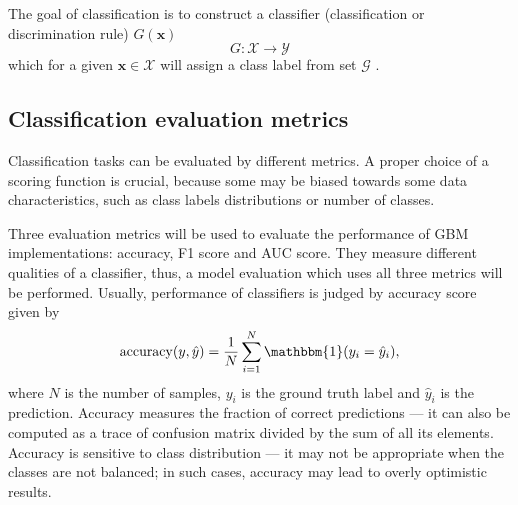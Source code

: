 \documentclass[magisterska, english]{pwr_wmat_praca_dyplomowa}
\theoremstyle{plain}
\numberwithin{theorem}{chapter}
\theoremstyle{definition}
\numberwithin{theorem}{chapter}
\begin{document}
The goal of classification is to construct a classifier (classification or discrimination rule) $G(\mathbf{x})$ 
\begin{equation}
    G\colon \mathcal{X}\to \mathcal{Y}
\end{equation}
which for a given $\mathbf{x}\in\mathcal{X}$ will assign a class label from set $\mathcal{G}$ \cite{uczenie}.

\subsection{Classification evaluation metrics}\label{section:metrics}
Classification tasks can be evaluated by different metrics. A proper choice of a scoring function is crucial, because some may be biased towards some data characteristics, such as class labels distributions or number of classes. 

Three evaluation metrics will be used to evaluate the performance of GBM implementations: accuracy, F1 score and AUC score. They measure different qualities of a classifier, thus, a model evaluation which uses all three metrics will be performed. Usually, performance of classifiers is judged by accuracy score given by \cite{sklearn}
\begin{equation}
    \mathrm{accuracy}(y, \hat{y}) = \frac 1N \sum_{i=1}^N \mathbbm{1}(y_i = \hat{y}_i),
\end{equation}
where $N$ is the number of samples, $y_i$ is the ground truth label and $\hat{y}_i$ is the prediction. Accuracy measures the fraction of correct predictions --- it can also be computed as a trace of confusion matrix divided by the sum of all its elements. Accuracy is sensitive to class distribution --- it may not be appropriate when the classes are not balanced; in such cases, accuracy may lead to overly optimistic results.
\end{document}
